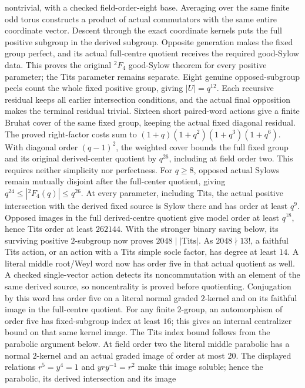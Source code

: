 nontrivial, with a checked field-order-eight base. Averaging over the
same finite odd torus constructs a product of actual commutators with
the same entire coordinate vector. Descent through the exact coordinate
kernels puts the full positive subgroup in the derived subgroup.
Opposite generation makes the fixed group perfect, and its actual
full-centre quotient receives the required good-Sylow data. This proves
the original ${}^2F_4$ good-Sylow theorem for every positive parameter;
the Tits parameter remains separate.
Eight genuine opposed-subgroup peels count the whole fixed positive group,
giving $|U|=q^{12}$. Each recursive residual keeps all earlier intersection
conditions, and the actual final opposition makes the terminal residual
trivial. Sixteen short paired-word actions give a finite Bruhat cover of
the same fixed group, keeping the actual fixed diagonal residual. The
proved right-factor costs sum to
$(1+q)(1+q^2)(1+q^3)(1+q^6)$. With diagonal order $(q-1)^2$, the weighted
cover bounds the full fixed group and its original derived-center
quotient by $q^{26}$, including at field order two. This requires neither
simplicity nor perfectness.
For $q\geq8$, opposed actual Sylows remain mutually disjoint after the
full-center quotient, giving $q^{24}\leq|{}^2F_4(q)|\leq q^{26}$.
At every parameter, including Tits, the actual positive intersection
with the derived fixed source is Sylow there and has order at least
$q^9$. Opposed images in the full derived-centre quotient give model
order at least $q^{18}$, hence Tits order at least $262144$. With the
stronger binary saving below, its surviving positive $2$-subgroup now
proves $2048\mid|\mathrm{Tits}|$. As $2048\nmid13!$, a faithful Tits
action, or an action with a Tits simple socle factor, has degree at
least $14$. A literal
middle root/Weyl word now has order five in that actual quotient as
well. A checked single-vector action detects its noncommutation with
an element of the same derived source, so noncentrality is proved
before quotienting. Conjugation by this word has order five on a
literal normal graded $2$-kernel and on its faithful image in the
full-centre quotient. For any finite $2$-group, an automorphism of
order five has fixed-subgroup index at least $16$; this gives an
internal centralizer bound on that same kernel image. The Tits index
bound follows from the parabolic argument below. At field
order two the literal middle parabolic has
a normal $2$-kernel and an actual graded image of order at most $20$.
The displayed relations $r^5=y^4=1$ and $yry^{-1}=r^2$ make this image
soluble; hence the parabolic, its derived intersection and its image

